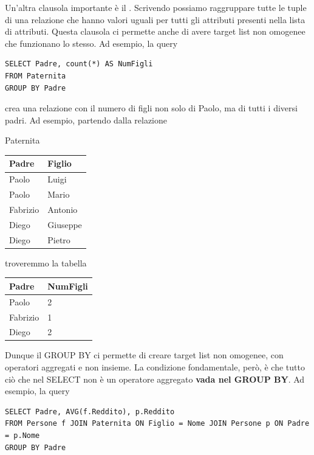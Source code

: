 \documentclass[11pt, a4paper, titlepage, oneside]{scrbook}
\begin{document}
Un'altra clausola importante è il . Scrivendo  possiamo raggruppare tutte le tuple di una relazione che hanno valori uguali per tutti gli attributi presenti nella lista di attributi. Questa clausola ci permette anche di avere target list non omogenee che funzionano lo stesso. Ad esempio, la query

\begin{lstlisting}
SELECT Padre, count(*) AS NumFigli
FROM Paternita
GROUP BY Padre
\end{lstlisting}

crea una relazione con il numero di figli non solo di Paolo, ma di tutti i diversi padri. Ad esempio, partendo dalla relazione

\begin{center}
Paternita \nopagebreak
    
\begin{tabular}{|l|l|}\hline
\textbf{Padre} & \textbf{Figlio}   \\ \hline
Paolo & Luigi \\
Paolo & Mario \\
Fabrizio & Antonio \\
Diego & Giuseppe \\
Diego & Pietro \\ \hline
\end{tabular}
\end{center}

troveremmo la tabella

\begin{center} 
\begin{tabular}{|l|l|}\hline
\textbf{Padre} & \textbf{NumFigli}   \\ \hline
Paolo & 2 \\
Fabrizio & 1 \\
Diego & 2 \\ \hline
\end{tabular}
\end{center}

Dunque il GROUP BY ci permette di creare target list non omogenee, con operatori aggregati e non insieme. La condizione fondamentale, però, è che tutto ciò che nel SELECT non è un operatore aggregato \textbf{vada nel GROUP BY}. Ad esempio, la query 
\begin{lstlisting}
SELECT Padre, AVG(f.Reddito), p.Reddito 
FROM Persone f JOIN Paternita ON Figlio = Nome JOIN Persone p ON Padre = p.Nome
GROUP BY Padre
\end{lstlisting}
\end{document}
